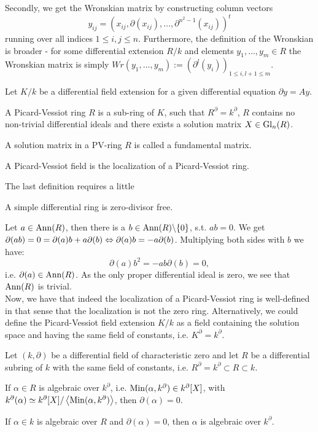 \indent Secondly, we get the Wronskian matrix by constructing column vectors $$y_{ij} = \left(x_{ij},\partial(x_{ij}),\ldots,\partial^{n^2-1}(x_{ij})\right)^t$$running over all indices $1 \leq i,j \leq n$. Furthermore, the definition of the Wronskian is broader - for some differential extension $R/k$ and elements
$y_1, \ldots, y_m \in R$ the Wronskian matrix is simply $Wr(y_1,\ldots,y_m) := (\partial^l(y_i))_{1 \leq i,l + 1 \leq m}$.
\begin{defi}
Let $K/k$ be a differential field extension for a given differential equation $\partial y = A y$.
\bn
\item A Picard-Vessiot ring $R$ is a sub-ring of $K$, such that
$R^\partial = k^\partial$, $R$ contains no non-trivial differential ideals and there exists a solution matrix $X \in \mathrm{Gl}_n(R)$.
\item A solution matrix in a PV-ring $R$ is called a fundamental matrix.
\item A Picard-Vessiot field is the localization of a Picard-Vessiot ring.
\en
\end{defi}
The last definition requires a little
\begin{lemm}
A simple differential ring is zero-divisor free.
\end{lemm}
\bws Let $a \in \mathrm{Ann}(R)$, then there is a $b \in \mathrm{Ann}(R)\backslash\{0\}$, s.t. $a b = 0$. We get $\partial(a b) = 0 = \partial(a) b + a \partial(b) \Leftrightarrow \partial(a) b = -a \partial(b)$. Multiplying both sides with $b$ we have:
$$\partial(a) b^2 = -a b \partial(b) = 0,$$
i.e. $\partial(a) \in \mathrm{Ann}(R)$. As the only proper differential ideal is zero, we see that $\mathrm{Ann}(R)$ is trivial.\\
Now, we have that indeed the localization of a Picard-Vessiot ring is well-defined in that sense that the localization is not the zero ring. Alternatively, we could define the Picard-Vessiot field extension $K/k$ as a field containing the solution space and having the same field of constants, i.e. $K^{\partial} = k^{\partial}$.
\newcommand{\minpoly}[1]{\trm{Min}(\alpha,#1)}
\newcommand{\minpolyC}{\minpoly{k^\partial}}
\newcommand{\minpolyR}{\minpoly{R}}
\begin{lemm}
Let $(k,\partial)$ be a differential field of characteristic zero and let $R$ be a differential subring of $k$
with the same field of constants, i.e. $R^\partial = k^\partial \subset R \subset k$.
\bn
\item If $\alpha \in R$ is algebraic over $k^\partial$, i.e. $\minpolyC \in k^\partial[X]$, with $k^\partial(\alpha) \simeq k^\partial[X]/\left<\minpolyC\right>$, then $\partial(\alpha) = 0$.
\item If $\alpha \in k$ is algebraic over $R$ and $\partial(\alpha) = 0$, then $\alpha$ is algebraic over $k^\partial$.
\en
\end{lemm}
